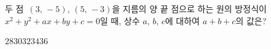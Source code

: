 두 점~$(3,\,-5)$, $(5,\,-3)$을 지름의 양 끝 점으로 하는 원의 방정식이 $x^2+y^2+ax+by+c=0$일 때, 상수 $a$, $b$, $c$에 대하여 $a+b+c$의 값은?
\begin{choices32}{$28$}{$30$}{$32$}{$34$}{$36$}\end{choices32}
